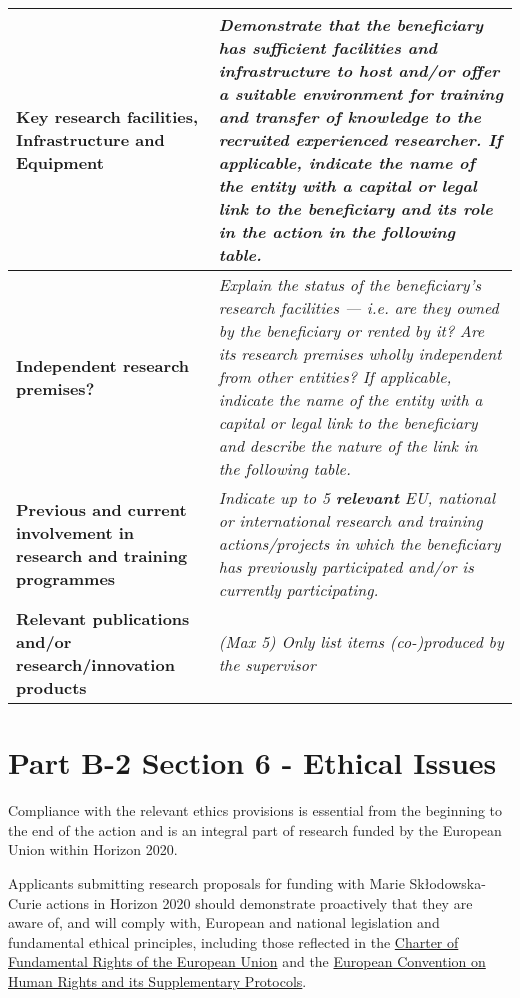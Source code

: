 \begin{table}[h!]
{\begin{tabular}{|>{\raggedright}p{}|p{}|}
\\\hline
\textbf{Key research facilities, Infrastructure and Equipment} &
{\em Demonstrate that the beneficiary has sufficient facilities and
infrastructure to host and/or offer a suitable environment for
training and transfer of knowledge to the recruited
experienced researcher.
\newline
If applicable, indicate the name of the entity with a capital or
legal link to the beneficiary and its role in the action in the
following table.}
\\\hline
\textbf{Independent research premises?} &
{\em Explain the status of the beneficiary's research facilities \---- i.e.
are they owned by the beneficiary or rented by it? Are its
research premises wholly independent from other entities?
\newline
If applicable, indicate the name of the entity with a capital or
legal link to the beneficiary and describe the nature of the
link in the following table.}
\\\hline
\textbf{Previous and current involvement in research and training programmes} &
{\em Indicate up to 5 \textbf{relevant} EU, national or international
research and training actions/projects in which the
beneficiary has previously participated and/or is currently
participating.}
\\\hline
\textbf{Relevant publications and/or research/innovation products} &
{\em (Max 5) Only list items (co-)produced by the supervisor}
\\\hline
\end{tabular}}
\end{table}




\newpage
\section{Part B-2 Section 6 - Ethical Issues}
\label{sec:ethics}

Compliance with the relevant ethics provisions is essential from the beginning to the end of
the action and is an integral part of research funded by the European Union within Horizon 2020. 

\medskip\noindent
Applicants submitting research proposals for funding with Marie Sk\l{}odowska-Curie actions in
Horizon 2020 should demonstrate proactively that they are aware of, and will comply with, European
and national legislation and fundamental ethical principles, including those reflected in the 
\href{http://www.europarl.europa.eu/charter/pdf/text_en.pdf}{Charter of Fundamental Rights of the European Union}
and the \href{http://www.echr.coe.int/Documents/Convention_ENG.pdf}{European Convention on Human Rights and its Supplementary Protocols}.

